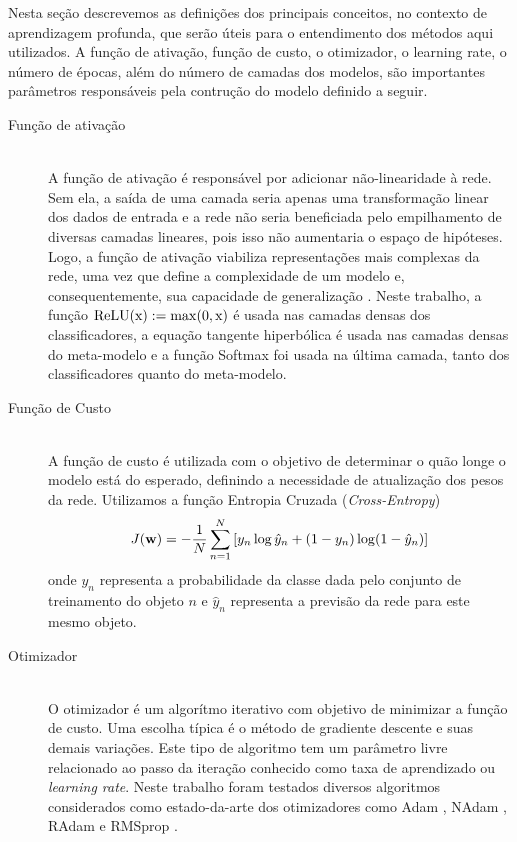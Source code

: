 \documentclass[a4,12pt]{horizon-theme}
\begin{document}
Nesta seção descrevemos as definições dos principais conceitos, no contexto de aprendizagem profunda, que serão úteis para o entendimento dos métodos aqui utilizados. A função de ativação, função de custo, o otimizador, o learning rate, o número de épocas, além do número de camadas dos modelos, são importantes parâmetros responsáveis pela contrução do modelo definido a seguir.

\begin{description}
  \item[Função de ativação] \hfill \\
        A função de ativação é responsável por adicionar não-linearidade à rede. Sem ela, a saída de uma camada seria apenas uma transformação linear dos dados de entrada e a rede não seria beneficiada pelo empilhamento de diversas camadas lineares, pois isso não aumentaria o espaço de hipóteses. Logo, a função de ativação viabiliza representações mais complexas da rede, uma vez que define a complexidade de um modelo e, consequentemente, sua capacidade de generalização \citep{CholletBook}. Neste trabalho, a função $\rm{ReLU}(x) := \rm{max}(0, x)$ é usada nas camadas densas dos classificadores, a equação tangente hiperbólica é usada nas camadas densas do meta-modelo e a função Softmax \citep{Bridle1990} foi usada na última camada, tanto dos classificadores quanto do meta-modelo.

  \item[Função de Custo] \hfill \\
        A função de custo é utilizada com o objetivo de determinar o quão longe o modelo está do esperado, definindo a necessidade de atualização dos pesos da rede. Utilizamos a função Entropia Cruzada (\emph{Cross-Entropy})
        \begin{equation}
          \label{eq:custo}
          J({\bf w}) = -\frac{1}{N}\sum_{n=1}^N\left[ y_n\log \hat y_n + (1 - y_n)\log (1 - \hat y_n) \right]
        \end{equation}
        onde $y_n$ representa a probabilidade da classe dada pelo conjunto de treinamento do objeto $n$ e $\hat{y}_n$ representa a previsão da rede para este mesmo objeto.

  \item[Otimizador] \hfill \\
        O otimizador é um algorítmo iterativo com objetivo de minimizar a função de custo. Uma escolha típica é o método de gradiente descente e suas demais variações. Este tipo de algoritmo tem um parâmetro livre relacionado ao passo da iteração conhecido como taxa de aprendizado ou \textit{learning rate}. Neste trabalho foram testados diversos algoritmos considerados como estado-da-arte dos otimizadores como Adam \citep{Adam}, NAdam \citep{NAdam}, RAdam \citep{RAdam} e RMSprop \citep{RMSprop}.


\end{description}
\end{document}

